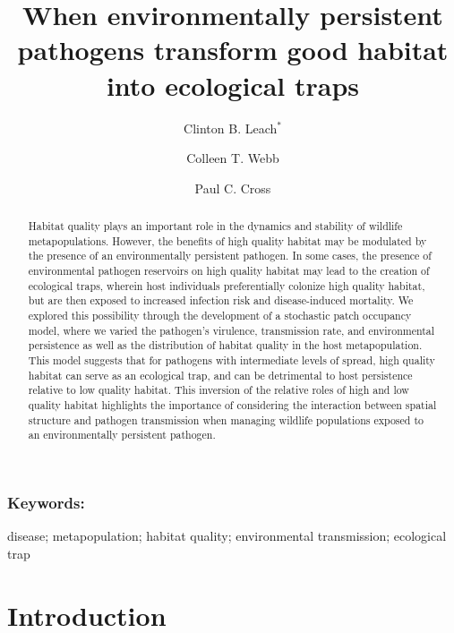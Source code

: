 \documentclass{article}
\begin{document}
\title{When environmentally persistent pathogens transform good habitat into ecological traps}

\author[1]{Clinton B. Leach$^*$}
\author[1]{Colleen T. Webb}
\author[2]{Paul C. Cross}


\maketitle

\begin{abstract} 
Habitat quality plays an important role in the dynamics and stability of wildlife metapopulations.
However, the benefits of high quality habitat may be modulated by the presence of an environmentally persistent pathogen. In some cases, the presence of environmental pathogen reservoirs on high quality habitat may lead to the creation of ecological traps, wherein host individuals preferentially colonize high quality habitat, but are then exposed to increased infection risk and disease-induced mortality.  We explored this possibility through the development of a stochastic patch occupancy model, where we varied the pathogen's virulence, transmission rate, and environmental persistence as well as the distribution of habitat quality in the host metapopulation.  This model suggests that for pathogens with intermediate levels of spread, high quality habitat can serve as an ecological trap, and can be detrimental to host persistence relative to low quality habitat.  This inversion of the relative roles of high and low quality habitat highlights the importance of considering the interaction between spatial structure and pathogen transmission when managing wildlife populations exposed to an environmentally persistent pathogen.
\end{abstract}

\subsubsection*{Keywords:}
disease; metapopulation; habitat quality; environmental transmission; ecological trap

\section{Introduction}
\label{intro}
\end{document}
